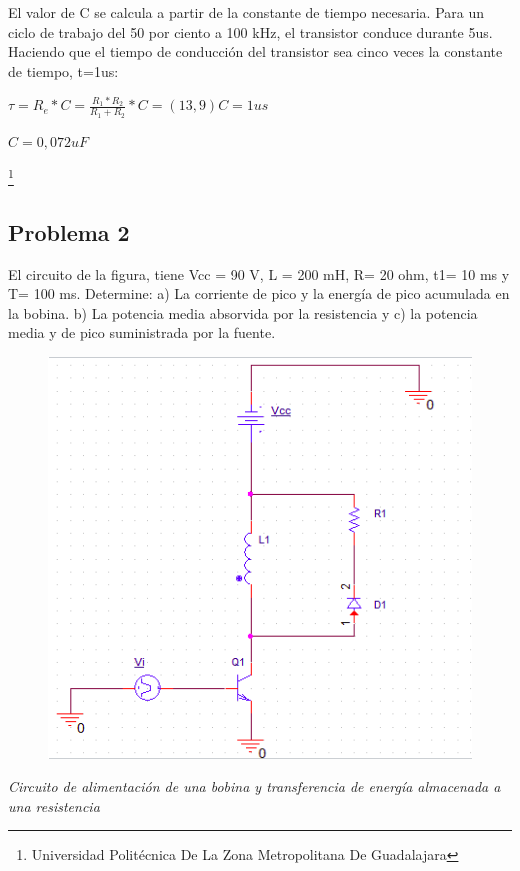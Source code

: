 \documentclass[11pt,a4paper]{article}
\begin{document}
El valor de C se calcula a partir de la constante de tiempo necesaria. Para un ciclo de trabajo del 50 por ciento a 100 kHz, el transistor conduce durante 5us. Haciendo que el tiempo de conducción del transistor sea cinco veces la constante de tiempo, t=1us:

\begin{Huge}
$ \tau = R_e * C = \frac{R_1 * R_2}{R_1 + R_2} * C = (13,9)C = 1us   $

$ C = 0,072 uF
 $
\end{Huge}

\footnote{Universidad Politécnica De La Zona Metropolitana De Guadalajara} 

\newpage


\subsection{Problema 2}

El circuito de la figura, tiene Vcc = 90 V, L = 200 mH, R= 20 ohm, t1= 10 ms y T= 100 ms. Determine: a) La corriente de pico y la energía de pico acumulada en la bobina. b) La potencia media absorvida por la resistencia y c) la potencia media y de pico suministrada por la fuente.
 
\begin{figure}[hbtp]
\centering
\includegraphics[scale=0.60]{5.png}
\end{figure}
\textit{Circuito de alimentación de una bobina y transferencia de energía almacenada a una resistencia}
\end{document}
